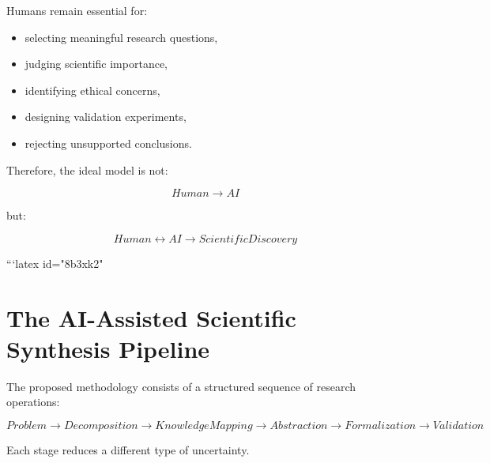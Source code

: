 \documentclass[11pt]{article}
\begin{document}
Humans remain essential for:


\begin{itemize}

\item selecting meaningful research questions,

\item judging scientific importance,

\item identifying ethical concerns,

\item designing validation experiments,

\item rejecting unsupported conclusions.

\end{itemize}



Therefore, the ideal model is not:


\[
Human
\rightarrow
AI
\]


but:


\[
Human
\leftrightarrow
AI
\rightarrow
Scientific Discovery
\]

```latex id="8b3xk2"
\section{The AI-Assisted Scientific Synthesis Pipeline}


The proposed methodology consists of a structured sequence of research
operations:


\[
Problem
\rightarrow
Decomposition
\rightarrow
Knowledge Mapping
\rightarrow
Abstraction
\rightarrow
Formalization
\rightarrow
Validation
\]


Each stage reduces a different type of uncertainty.
\end{document}
